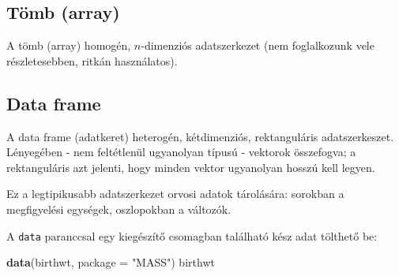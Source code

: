 \documentclass[]{book}
\newenvironment{Shaded}{\begin{snugshade}}{\end{snugshade}}
\newcommand{\KeywordTok}[1]{\textcolor[rgb]{0.13,0.29,0.53}{\textbf{#1}}}
\newcommand{\DataTypeTok}[1]{\textcolor[rgb]{0.13,0.29,0.53}{#1}}
\newcommand{\StringTok}[1]{\textcolor[rgb]{0.31,0.60,0.02}{#1}}
\newcommand{\NormalTok}[1]{#1}
\begin{document}
\subsection{Tömb (array)}\label{tomb-array}

A tömb (array) homogén, \(n\)-dimenziós adatszerkezet (nem foglalkozunk
vele részletesebben, ritkán használatos).

\subsection{Data frame}\label{data-frame}

A data frame (adatkeret) heterogén, kétdimenziós, rektanguláris
adatszerkeszet. Lényegében - nem feltétlenül ugyanolyan típusú -
vektorok összefogva; a rektanguláris azt jelenti, hogy minden vektor
ugyanolyan hosszú kell legyen.

Ez a legtipikusabb adatszerkezet orvosi adatok tárolására: sorokban a
megfigyelési egységek, oszlopokban a változók.

A \texttt{data} paranccsal egy kiegészítő csomagban található kész adat
tölthető be:

\begin{Shaded}
\begin{Highlighting}[]
\KeywordTok{data}\NormalTok{(birthwt, }\DataTypeTok{package =} \StringTok{"MASS"}\NormalTok{)}
\NormalTok{birthwt}
\end{Highlighting}
\end{Shaded}
\end{document}
